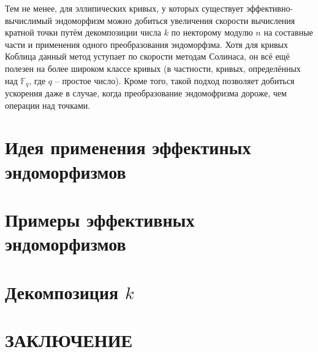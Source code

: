 \documentclass[a4paper,12pt]{article}
\theoremstyle{definition}
\begin{document}
	Тем не менее, для эллипических кривых, у которых существует эффективно-вычислимый эндоморфизм можно добиться увеличения скорости вычисления кратной точки путём декомпозиции числа $k$ по некторому модулю $n$ на составные части и применения одного преобразования эндоморфзма. Хотя для кривых Коблица данный метод уступает по скорости методам Солинаса, он всё ещё полезен на более широком классе кривых (в частности, кривых, определённых над $\mathbb{F}_q$, где $q$ -- простое число). Кроме того, такой подход позволяет добиться ускорения даже в случае, когда преобразование эндомофризма дороже, чем операции над точками.
	
	\newpage
	
	\section{Идея применения эффектиных эндоморфизмов}
		
	\section{Примеры эффективных эндоморфизмов}

	\section{Декомпозиция $k$}

	\section*{ЗАКЛЮЧЕНИЕ}
	
	
	\newpage
	\printbibliography[title={БИБЛИОГРАФИЧЕСКИЙ СПИСОК}]
		
	
\end{document}
